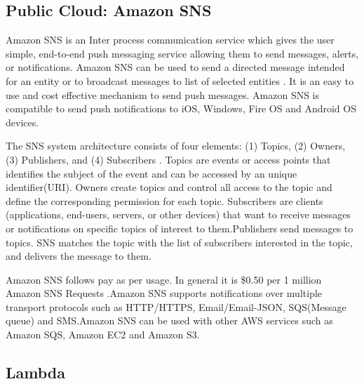      \pv
     
\subsection{Public Cloud: Amazon SNS}

     Amazon SNS is an Inter process communication service which gives
     the user simple, end-to-end push messaging service allowing them
     to send messages, alerts, or notifications. Amazon SNS can be
     used to send a directed message
     intended for an entity or to broadcast messages to list of
     selected entities \cite{www-sns-webpage}.
     It is an easy to use and cost effective
     mechanism to send push messages. Amazon SNS is compatible to send
     push notifications to iOS, Windows, Fire OS and Android OS
     devices.

     The SNS system architecture consists
     of four elements: (1) Topics, (2) Owners, (3) Publishers, and
     (4) Subscribers \cite{www-sns-blog}. Topics are events or access
     points that identifies
     the subject of the event and can be accessed by an unique
     identifier(URI). Owners create topics and control all access to
     the topic and define the corresponding permission for each
     topic. Subscribers are clients (applications, end-users,
     servers, or other devices) that want to receive messages or
     notifications on specific topics of interest to them.Publishers
     send messages to topics. SNS matches the topic with the list of
     subscribers interested in the topic, and delivers the message to
     them.

     Amazon SNS follows pay as per
     usage. In general it is \$0.50 per 1 million Amazon SNS
     Requests \cite{www-sns-faq}.Amazon SNS supports notifications over multiple
     transport protocols such as HTTP/HTTPS, Email/Email-JSON,
     SQS(Message queue) and SMS.Amazon SNS can be used with other AWS
     services such as Amazon SQS, Amazon EC2 and Amazon S3.

     \pv

\subsection{Lambda}


